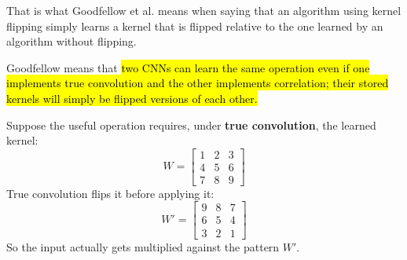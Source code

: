 \begin{itemize}
    \highspace
    That is what Goodfellow et al.\cite{Goodfellow-et-al-2016} means when saying that an algorithm using kernel flipping simply learns a kernel that is flipped relative to the one learned by an algorithm without flipping.

    \begin{deepeningbox}
        Goodfellow means that \hl{two CNNs can learn the same operation even if one implements true convolution and the other implements correlation; their stored kernels will simply be flipped versions of each other.}

        \highspace
        Suppose the useful operation requires, under \textbf{true convolution}, the learned kernel:
        \begin{equation*}
            W = \begin{bmatrix}
                1 & 2 & 3 \\
                4 & 5 & 6 \\
                7 & 8 & 9
            \end{bmatrix}
        \end{equation*}
        True convolution flips it before applying it:
        \begin{equation*}
            W' = \begin{bmatrix}
                9 & 8 & 7 \\
                6 & 5 & 4 \\
                3 & 2 & 1
            \end{bmatrix}
        \end{equation*}
        So the input actually gets multiplied against the pattern $W'$.


\end{deepeningbox}
\end{itemize}
